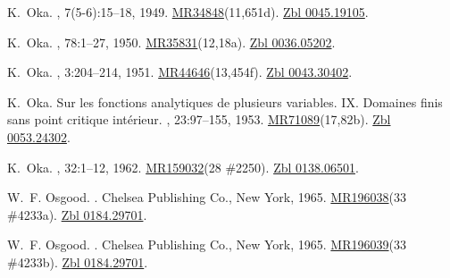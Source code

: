 \documentclass[11pt,a4paper, final, twoside]{article}
\numberwithin{equation}{section}
\begin{document}
\begin{appendices}
\begin{thebibliography}{100}
K.~Oka.
, 7(5-6):15--18, 1949.
\newblock
  \href{http://www.ams.org/mathscinet-getitem?mr=34848}{MR34848}(11,651d).
  \href{http://zbmath.org/?q=an:0045.19105}{Zbl 0045.19105}.

K.~Oka.
,
  78:1--27, 1950.
\newblock
  \href{http://www.ams.org/mathscinet-getitem?mr=35831}{MR35831}(12,18a).
  \href{http://zbmath.org/?q=an:0036.05202}{Zbl 0036.05202}.

K.~Oka.
, 3:204--214,
  1951.
\newblock
  \href{http://www.ams.org/mathscinet-getitem?mr=44646}{MR44646}(13,454f).
  \href{http://zbmath.org/?q=an:0043.30402}{Zbl 0043.30402}.

K.~Oka.
\newblock Sur les fonctions analytiques de plusieurs variables. {IX}.
  {D}omaines finis sans point critique int{\'e}rieur.
, 23:97--155, 1953.
\newblock
  \href{http://www.ams.org/mathscinet-getitem?mr=71089}{MR71089}(17,82b).
  \href{http://zbmath.org/?q=an:0053.24302}{Zbl 0053.24302}.

K.~Oka.
, 32:1--12, 1962.
\newblock \href{http://www.ams.org/mathscinet-getitem?mr=159032}{MR159032}(28
  \#2250). \href{http://zbmath.org/?q=an:0138.06501}{Zbl 0138.06501}.

W.~F. Osgood.
.
\newblock Chelsea Publishing Co., New York, 1965.
\newblock \href{http://www.ams.org/mathscinet-getitem?mr=196038}{MR196038}(33
  \#4233a). \href{http://zbmath.org/?q=an:0184.29701}{Zbl 0184.29701}.

W.~F. Osgood.
.
\newblock Chelsea Publishing Co., New York, 1965.
\newblock \href{http://www.ams.org/mathscinet-getitem?mr=196039}{MR196039}(33
  \#4233b). \href{http://zbmath.org/?q=an:0184.29701}{Zbl 0184.29701}.


\end{thebibliography}
\end{appendices}
\end{document}
